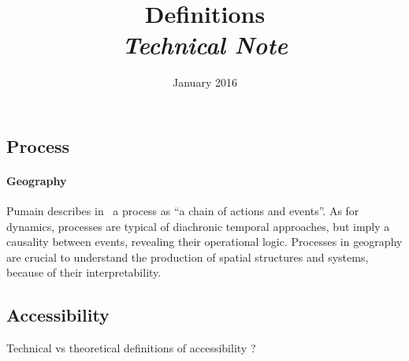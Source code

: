 


\title{Definitions
\bigskip\\
\textit{Technical Note}
}
\author{}
\date{January 2016}


\maketitle

\justify



\subsection*{Process}

\paragraph{Geography}

Pumain describes in~\cite{hypergeo} a process as ``a chain of actions and events''. As for dynamics, processes are typical of diachronic temporal approaches, but imply a causality between events, revealing their operational logic. Processes in geography are crucial to understand the production of spatial structures and systems, because of their interpretability.






\subsection*{Accessibility}

Technical vs theoretical definitions of accessibility ?













